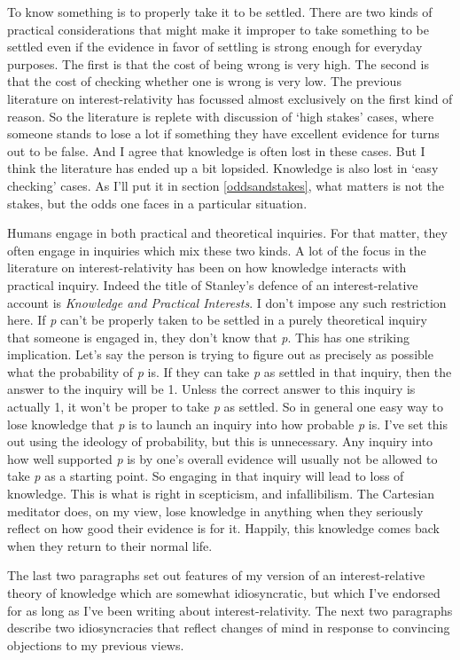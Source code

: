 \documentclass[
  11pt,
]{book}
\begin{document}
To know something is to properly take it to be settled. There are two kinds of practical considerations that might make it improper to take something to be settled even if the evidence in favor of settling is strong enough for everyday purposes. The first is that the cost of being wrong is very high. The second is that the cost of checking whether one is wrong is very low. The previous literature on interest-relativity has focussed almost exclusively on the first kind of reason. So the literature is replete with discussion of `high stakes' cases, where someone stands to lose a lot if something they have excellent evidence for turns out to be false. And I agree that knowledge is often lost in these cases. But I think the literature has ended up a bit lopsided. Knowledge is also lost in `easy checking' cases. As I'll put it in section \ref{oddsandstakes}, what matters is not the stakes, but the odds one faces in a particular situation.

Humans engage in both practical and theoretical inquiries. For that matter, they often engage in inquiries which mix these two kinds. A lot of the focus in the literature on interest-relativity has been on how knowledge interacts with practical inquiry. Indeed the title of Stanley's defence of an interest-relative account is \emph{Knowledge and Practical Interests}. I don't impose any such restriction here. If \emph{p} can't be properly taken to be settled in a purely theoretical inquiry that someone is engaged in, they don't know that \emph{p}. This has one striking implication. Let's say the person is trying to figure out as precisely as possible what the probability of \emph{p} is. If they can take \emph{p} as settled in that inquiry, then the answer to the inquiry will be 1. Unless the correct answer to this inquiry is actually 1, it won't be proper to take \emph{p} as settled. So in general one easy way to lose knowledge that \emph{p} is to launch an inquiry into how probable \emph{p} is. I've set this out using the ideology of probability, but this is unnecessary. Any inquiry into how well supported \emph{p} is by one's overall evidence will usually not be allowed to take \emph{p} as a starting point. So engaging in that inquiry will lead to loss of knowledge. This is what is right in scepticism, and infallibilism. The Cartesian meditator does, on my view, lose knowledge in anything when they seriously reflect on how good their evidence is for it. Happily, this knowledge comes back when they return to their normal life.

The last two paragraphs set out features of my version of an interest-relative theory of knowledge which are somewhat idiosyncratic, but which I've endorsed for as long as I've been writing about interest-relativity. The next two paragraphs describe two idiosyncracies that reflect changes of mind in response to convincing objections to my previous views.
\end{document}
